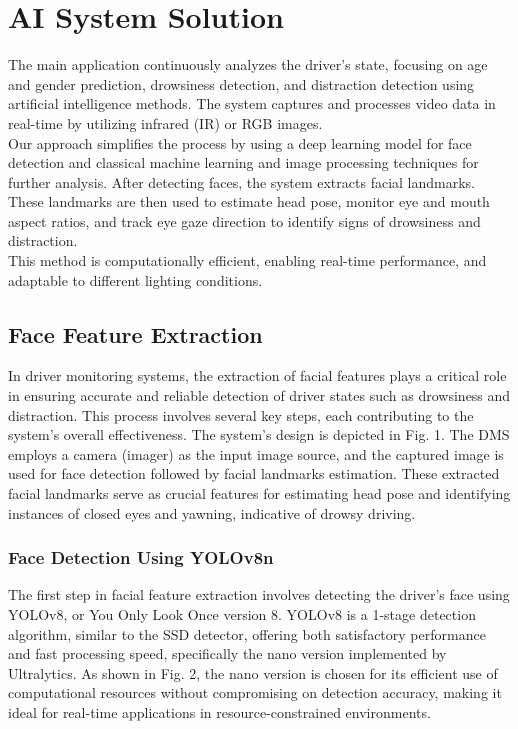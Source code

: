 \newpage
\section{AI  System Solution}
The main application continuously analyzes the driver’s state, focusing on age and gender prediction, drowsiness detection, and distraction detection using artificial intelligence methods. The system captures and processes video data in real-time by utilizing infrared (IR) or RGB images.\\

Our approach simplifies the process by using a deep learning model for face detection and classical machine learning and image processing techniques for further analysis. After detecting faces, the system extracts facial landmarks. These landmarks are then used to estimate head pose, monitor eye and mouth aspect ratios, and track eye gaze direction to identify signs of drowsiness and distraction.\\

This method is computationally efficient, enabling real-time performance, and adaptable to different lighting conditions. 

\subsection{ Face Feature Extraction}

In driver monitoring systems, the extraction of facial features plays a critical role in ensuring accurate and reliable detection of driver states such as drowsiness and distraction. This process involves several key steps, each contributing to the system's overall effectiveness. The system's design is depicted in Fig. 1. The DMS employs a camera (imager) as the input image source, and the captured image is used for face detection followed by facial landmarks estimation. These extracted facial landmarks serve as crucial features for estimating head pose and identifying instances of closed eyes and yawning, indicative of drowsy driving.

\subsubsection{Face Detection Using YOLOv8n}

The first step in facial feature extraction involves detecting the driver's face using YOLOv8, or You Only Look Once version 8. YOLOv8 is a 1-stage detection algorithm, similar to the SSD detector, offering both satisfactory performance and fast processing speed, specifically the nano version implemented by Ultralytics. As shown in Fig. 2, the nano version is chosen for its efficient use of computational resources without compromising on detection accuracy, making it ideal for real-time applications in resource-constrained environments. \\

